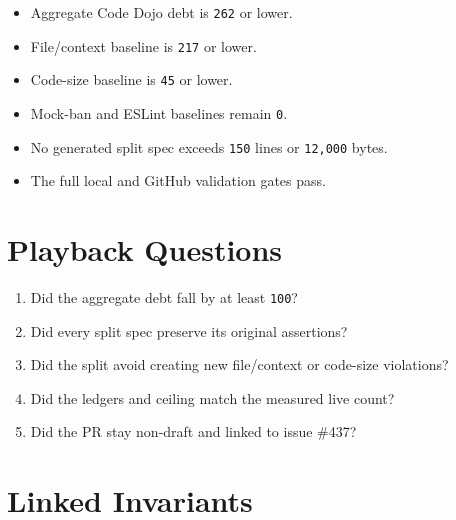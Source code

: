 \begin{itemize}
\tightlist
\item
  Aggregate Code Dojo debt is \texttt{2\allowbreak{}6\allowbreak{}2} or lower.
\item
  File/context baseline is \texttt{2\allowbreak{}1\allowbreak{}7} or lower.
\item
  Code-size baseline is \texttt{4\allowbreak{}5} or lower.
\item
  Mock-ban and ESLint baselines remain \texttt{0}.
\item
  No generated split spec exceeds \texttt{1\allowbreak{}5\allowbreak{}0} lines or \texttt{1\allowbreak{}2\allowbreak{},\allowbreak{}0\allowbreak{}0\allowbreak{}0} bytes.
\item
  The full local and GitHub validation gates pass.
\end{itemize}

\section{Playback Questions}\label{record-243-playback-questions}

\begin{enumerate}
\def\labelenumi{\arabic{enumi}.}
\tightlist
\item
  Did the aggregate debt fall by at least \texttt{1\allowbreak{}0\allowbreak{}0}?
\item
  Did every split spec preserve its original assertions?
\item
  Did the split avoid creating new file/context or code-size violations?
\item
  Did the ledgers and ceiling match the measured live count?
\item
  Did the PR stay non-draft and linked to issue \#437?
\end{enumerate}

\section{Linked Invariants}\label{record-243-linked-invariants}


